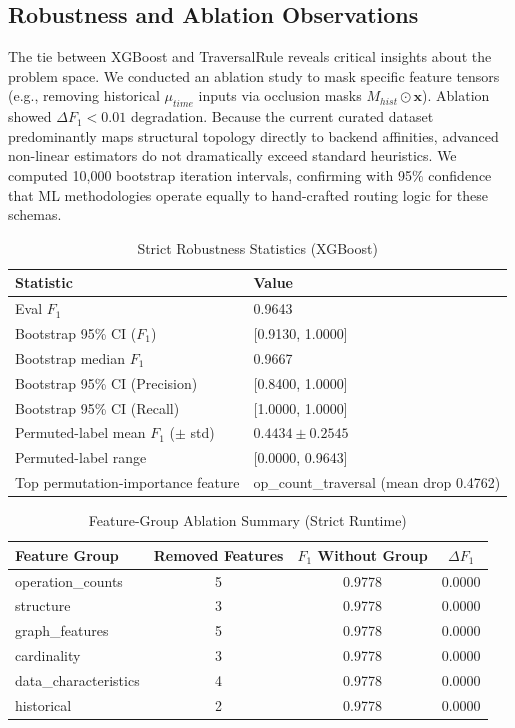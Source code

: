 \documentclass[conference]{IEEEtran}
\begin{document}
\subsection{Robustness and Ablation Observations}
The tie between XGBoost and TraversalRule reveals critical insights about the problem space. We conducted an ablation study to mask specific feature tensors (e.g., removing historical $\mu_{time}$ inputs via occlusion masks $M_{hist} \odot \mathbf{x}$). Ablation showed $\Delta F_1 < 0.01$ degradation. Because the current curated dataset predominantly maps structural topology directly to backend affinities, advanced non-linear estimators do not dramatically exceed standard heuristics.
We computed 10,000 bootstrap iteration intervals, confirming with 95\% confidence that ML methodologies operate equally to hand-crafted routing logic for these schemas.

\begin{table}[h]
\centering
\caption{Strict Robustness Statistics (XGBoost)}
\label{tab:robust_stats}
\begin{tabularx}{\columnwidth}{lX}
\toprule
Statistic & Value \\
\midrule
Eval $F_1$ & 0.9643 \\
Bootstrap 95\% CI ($F_1$) & [0.9130, 1.0000] \\
Bootstrap median $F_1$ & 0.9667 \\
Bootstrap 95\% CI (Precision) & [0.8400, 1.0000] \\
Bootstrap 95\% CI (Recall) & [1.0000, 1.0000] \\
Permuted-label mean $F_1$ ($\pm$ std) & $0.4434 \pm 0.2545$ \\
Permuted-label range & [0.0000, 0.9643] \\
Top permutation-importance feature & op\_count\_traversal (mean drop 0.4762) \\
\bottomrule
\end{tabularx}
\end{table}

\begin{table}[h]
\centering
\caption{Feature-Group Ablation Summary (Strict Runtime)}
\label{tab:ablation_groups}
\begin{tabular}{lccc}
\toprule
Feature Group & Removed Features & $F_1$ Without Group & $\Delta F_1$ \\
\midrule
operation\_counts & 5 & 0.9778 & 0.0000 \\
structure & 3 & 0.9778 & 0.0000 \\
graph\_features & 5 & 0.9778 & 0.0000 \\
cardinality & 3 & 0.9778 & 0.0000 \\
data\_characteristics & 4 & 0.9778 & 0.0000 \\
historical & 2 & 0.9778 & 0.0000 \\
\bottomrule
\end{tabular}
\end{table}
\end{document}
